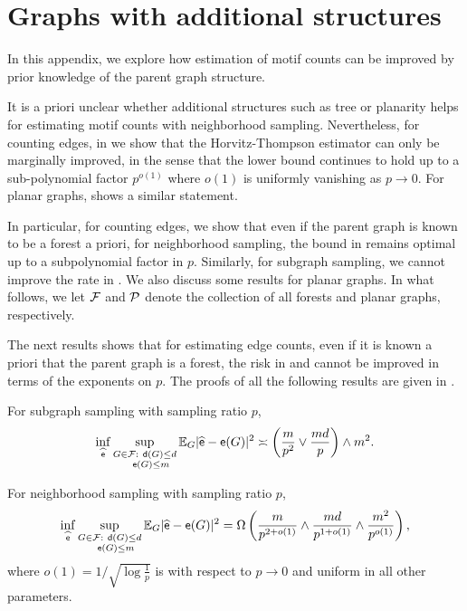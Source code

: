 \section{Graphs with additional structures} \label{app:structure}

In this appendix, we explore how estimation of motif counts can be improved by prior knowledge of the parent graph structure.


It is a priori unclear whether additional structures such as tree or planarity helps for estimating motif counts with neighborhood sampling. 
Nevertheless, for counting edges, in  we show that the Horvitz-Thompson estimator  can only be marginally improved, in the sense that the lower bound continues to hold up to a sub-polynomial factor $p^{o(1)}$ where $o(1)$ is uniformly vanishing as $p\to 0$. For planar graphs,  shows a similar statement.

In particular, for counting edges, we show that even if the parent graph is known to be a forest a priori, for neighborhood sampling, the bound in  remains optimal up to a subpolynomial factor in $p$. Similarly, for subgraph sampling, we cannot improve the rate in . We also discuss some results for planar graphs. In what follows, we let $ {\mathcal{F}} $ and $ {\mathcal{P}} $ denote the collection of all forests and planar graphs, respectively.

The next results shows that for estimating edge counts, even if it is known a priori that the parent graph is a forest, the risk in  and  cannot be improved in terms of the exponents on $p$. The proofs of all the following results are given in .

\begin{theorem} \label{thm:subgraph-rates-forest}
For subgraph sampling with sampling ratio $ p $,
\begin{equation}
\inf_{\widehat{{\mathsf{e}}}}\sup_{\substack{G\in {\mathcal{F}}: ~{\mathsf{d}}(G)\leq d\\ ~~~{\mathsf{e}}(G) \leq m}}\mathbb{E}_G|\widehat{{\mathsf{e}}}-{\mathsf{e}}(G)|^2 \asymp \left(\frac{m}{p^2} \vee  \frac{md}{p}\right)\wedge m^2.
\end{equation}
\end{theorem} 

\begin{theorem} \label{thm:edge-forest}
For neighborhood sampling with sampling ratio $ p $,
\begin{equation*}
\inf_{\widehat{{\mathsf{e}}}}\sup_{\substack{G \in {\mathcal{F}}: ~{\mathsf{d}}(G)\leq d\\ ~~~{\mathsf{e}}(G) \leq m}}\mathbb{E}_G|\widehat{{\mathsf{e}}}-{\mathsf{e}}(G)|^2 = \Omega \left( \frac{m}{p^{2+o(1)}} \wedge \frac{md}{p^{1+o(1)}} \wedge \frac{m^2}{p^{o(1)}} \right),
\end{equation*}
where $ o(1) = 1/\sqrt{\log \frac{1}{p}} $ is with respect to $ p\to0 $ and uniform in all other parameters.
\end{theorem}

